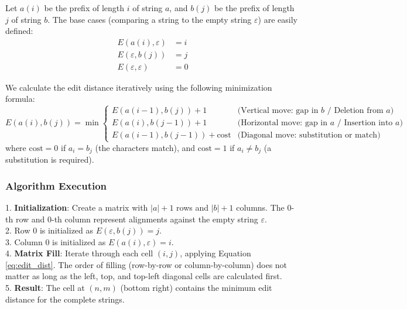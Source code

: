 Let \(a(i)\) be the prefix of length \(i\) of string \(a\), and \(b(j)\) be the prefix of length \(j\) of string \(b\). 
The base cases (comparing a string to the empty string \(\varepsilon\)) are easily defined:
\begin{align}
    E(a(i), \varepsilon) &= i \\
    E(\varepsilon, b(j)) &= j \\
    E(\varepsilon, \varepsilon) &= 0
\end{align}

We calculate the edit distance iteratively using the following minimization formula:
\begin{equation} \label{eq:edit_dist}
E(a(i), b(j)) = \min 
\begin{cases} 
E(a(i-1), b(j)) + 1 & \text{(Vertical move: gap in } b \text{ / Deletion from } a \text{)} \\
E(a(i), b(j-1)) + 1 & \text{(Horizontal move: gap in } a \text{ / Insertion into } a \text{)} \\
E(a(i-1), b(j-1)) + \text{cost} & \text{(Diagonal move: substitution or match)}
\end{cases}
\end{equation}
where \(\text{cost} = 0\) if \(a_i = b_j\) (the characters match), and \(\text{cost} = 1\) if \(a_i \neq b_j\) (a substitution is required).

\subsubsection{Algorithm Execution}
1. \textbf{Initialization}: Create a matrix with \(|a|+1\) rows and \(|b|+1\) columns. The 0-th row and 0-th column represent alignments against the empty string \(\varepsilon\).\\
2. Row 0 is initialized as \(E(\varepsilon, b(j)) = j\).\\
3. Column 0 is initialized as \(E(a(i), \varepsilon) = i\).\\
4. \textbf{Matrix Fill}: Iterate through each cell \((i,j)\), applying Equation \eqref{eq:edit_dist}. The order of filling (row-by-row or column-by-column) does not matter as long as the left, top, and top-left diagonal cells are calculated first.\\
5. \textbf{Result}: The cell at \((n, m)\) (bottom right) contains the minimum edit distance for the complete strings.

